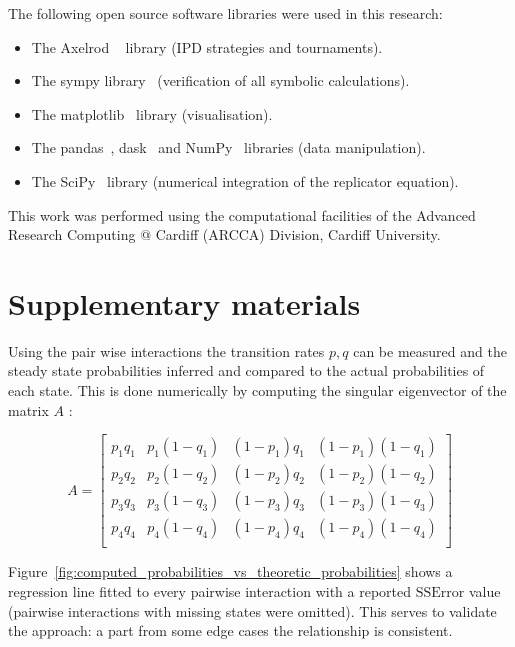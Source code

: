 \documentclass[a4paper]{article}
\begin{document}
The following open source software libraries were used in this research:

\begin{itemize}
    \item The Axelrod ~\cite{Knight2016, Knight2018} library (IPD strategies and
        tournaments).
    \item The sympy library~\cite{Meurer2017} (verification of all symbolic
        calculations).
    \item The matplotlib~\cite{Droettboom2018} library (visualisation).
    \item The pandas~\cite{Structures2010}, dask~\cite{Dask2016} and
        NumPy~\cite{Oliphant2015} libraries (data manipulation).
    \item The SciPy~\cite{Jones2001} library (numerical integration of the
        replicator equation).
\end{itemize}

This work was performed using the computational facilities of the Advanced
Research Computing @ Cardiff (ARCCA) Division, Cardiff University.

\printbibliography

\newpage
\section*{Supplementary materials}



\newpage

Using the pair wise interactions the transition rates \(p,
q\) can be measured and the steady state probabilities inferred and compared to
the actual probabilities of each state.
This is done numerically by computing the singular eigenvector of the
matrix \(A\) \cite{Stewart2009}:

\[
    A =
    \begin{bmatrix}
        p_1 q_1 & p_1 (1 - q_1) & (1 - p_1) q_1 & (1 -p_1) (1 - q_1) \\
        p_2 q_2 & p_2 (1 - q_2) & (1 - p_2) q_2 & (1 -p_2) (1 - q_2) \\
        p_3 q_3 & p_3 (1 - q_3) & (1 - p_3) q_3 & (1 -p_3) (1 - q_3) \\
        p_4 q_4 & p_4 (1 - q_4) & (1 - p_4) q_4 & (1 -p_4) (1 - q_4) \\
    \end{bmatrix}
\]

Figure~\ref{fig:computed_probabilities_vs_theoretic_probabilities} shows a
regression line fitted to every pairwise interaction with a reported
\(\text{SSError}\) value (pairwise interactions with missing states were
omitted). This serves to validate the approach: a part from some edge cases the
relationship is consistent.
\end{document}
